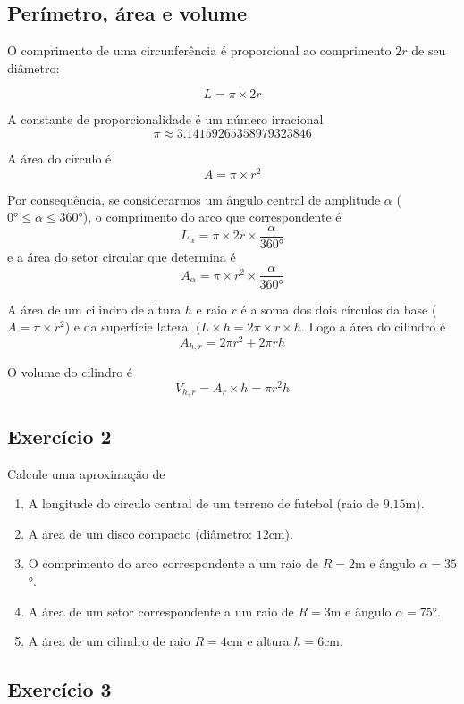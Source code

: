 \subsection*{Perímetro, área e volume}

O comprimento de uma circunferência é proporcional ao comprimento $2r$ de
seu diâmetro:

$$
L = \pi \times 2r
$$

A constante de proporcionalidade é um número irracional
$$\pi \approx 3.14159265358979323846$$

A área do círculo é
$$
A = \pi \times r^2
$$

Por consequência, se considerarmos um ângulo central de amplitude $\alpha$
($0° \leq \alpha \leq 360°$), o comprimento do arco que correspondente
é
$$
L_{\alpha} = \pi \times 2r \times \frac{\alpha}{360°}
$$
e a área do setor circular que determina é
$$
A_{\alpha} = \pi \times r^2 \times \frac{\alpha}{360°}
$$

A área de um cilindro de altura $h$ e raio $r$ é a soma dos dois círculos
da base ($A = \pi \times r^2$) e da superfície lateral
($L \times h = 2 \pi \times r \times h$. Logo a área do cilindro é
$$A_{h,r} = {2 \pi r^2} + {2\pi r h}$$

O volume do cilindro é
$$V_{h,r} = A_{r} \times h = \pi r^2 h$$

\subsection*{Exercício 2}

Calcule uma aproximação de

\begin{enumerate}
\item A longitude do círculo central de um terreno de futebol (raio de $9.15$m).
\item A área de um disco compacto (diâmetro: $12$cm).
\item O comprimento do arco correspondente a um raio de $R=2$m e ângulo
$\alpha=35$°.
\item A área de um setor correspondente a um raio de $R=3$m e ângulo
$\alpha=75$°.
\item A área de um cilindro de raio $R = 4\text{cm}$ e altura
  $h = 6\text{cm}$.
\end{enumerate}

\subsection*{Exercício 3}

